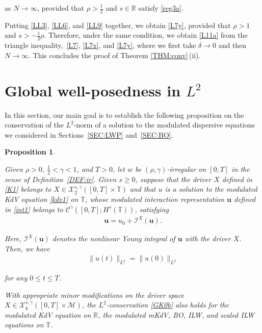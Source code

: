\documentclass[letterpaper, 11pt,  reqno]{amsart}
\newtheorem{proposition}[theorem]{Proposition}
\newcommand{\1}{\hspace{0.5mm}\text{I}\hspace{0.5mm}}
\newcommand{\I}{\mathcal{I}}
\newcommand{\noi}{\noindent}
\newcommand{\R}{\mathbb{R}}
\newcommand{\T}{\mathbb{T}}
\newcommand{\CC}{\mathcal{C}}
\newcommand{\dl}{\delta}
\newcommand{\g}{\gamma}
\newcommand{\M}{\mathcal{M}}
\newcommand{\cX}{\mathcal{X}}
\newcommand{\uu}{\mathbf{u}}
\numberwithin{equation}{section}
\numberwithin{theorem}{section}
\begin{document}
\noi
as $N \to \infty$, 
provided that 
 $\rho > \frac 12$ and $s \in \R$
satisfy 
\eqref{reg3a}.


\medskip

Putting 
\eqref{LL3}, 
\eqref{LL6},  and 
\eqref{LL9} together, 
we obtain \eqref{L7y}, 
provided that 
 $\rho > 1$ and $s > -\frac 12\rho$.
Therefore, under the same condition, 
we obtain
\eqref{L11a}
from the triangle inequality,~\eqref{L7}, \eqref{L7x}, and \eqref{L7y}, 
where we first take $\dl \to 0$ and then $N \to \infty$.
This  concludes the proof of Theorem \ref{THM:conv}\,(ii).




\section{Global well-posedness in 
$L^2$}
\label{SEC:GWP1}

In this section, 
our main goal is to  establish the following proposition on the conservation of the $L^2$-norm
of a solution to the modulated dispersive equations
we considered in Sections~\ref{SEC:LWP} and~\ref{SEC:BO}.




\begin{proposition}
\label{PROP:L2}

Given $\rho > 0$,  $\frac 12 < \g < 1$, and $T> 0$, 
let  $w$ be $(\rho,\g)$-irregular on $[0, T]$ in the sense of Definition~\ref{DEF:ir}.
Given $s \ge 0$, suppose that 
the driver $X$  defined in 
\eqref{K1} belongs to 
   $X \in \cX^{s, \g}_2([0, T]\times \T)$
   and that 
$u $ is a solution to the modulated KdV equation \eqref{kdv1} on $\T$,  whose
modulated interaction representation $\uu$ defined in \eqref{int1}
belongs to  $\CC^\g([0, T];H^s(\T)) $, 
satisfying 
\begin{align}
\uu  = u_0 + \I^X(\uu).
\label{GK0a}
\end{align}


\noi
Here,  $\I^X(\uu)$ denotes the nonlinear Young integral of $\uu$
with the driver $X$.
Then, we have
\begin{align}
\| u(t) \|_{L^2} = \| u(0) \|_{L^2}
\label{GK0b}
\end{align}

\noi
for any $0 \le t \le T$.

With appropriate minor modifications
on the driver space 
   $X \in \cX^{s, \g}_k([0, T]\times \M)$, 
the  $L^2$-conservation \eqref{GK0b} also  holds
for the modulated KdV equation on $\R$, 
the modulated mKdV, BO, ILW, and scaled ILW equations on $\T$.


 
\end{proposition}
\end{document}

